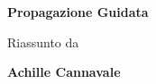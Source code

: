 \documentclass[titlepage, oneside]{book}
\begin{document}
\begin{titlepage}
\centering

 \vspace*{\fill}
    {\Huge\bfseries
Propagazione Guidata\par
}
\vspace{6ex}
{\Large
Riassunto da
\par}

        \vspace{1.5cm}
            
        \textbf{\large Achille Cannavale}
            
        \vfill

        \vspace{0.8cm}

   
\end{titlepage}

\large
\tableofcontents
\Large














\end{document}
